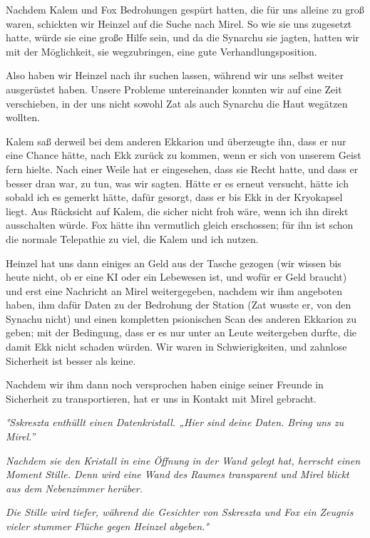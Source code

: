 \documentclass[11pt]{scrartcl}
\begin{document}
Nachdem Kalem und Fox Bedrohungen gespürt hatten, die für uns alleine zu
groß waren, schickten wir Heinzel auf die Suche nach Mirel. So wie sie
uns zugesetzt hatte, würde sie eine große Hilfe sein, und da die
Synarchu sie jagten, hatten wir mit der Möglichkeit, sie wegzubringen,
eine gute Verhandlungsposition.

Also haben wir Heinzel nach ihr suchen lassen, während wir uns selbst
weiter ausgerüstet haben. Unsere Probleme untereinander konnten wir auf
eine Zeit verschieben, in der uns nicht sowohl Zat als auch Synarchu die
Haut wegätzen wollten.

Kalem saß derweil bei dem anderen Ekkarion und überzeugte ihn, dass er
nur eine Chance hätte, nach Ekk zurück zu kommen, wenn er sich von
unserem Geist fern hielte. Nach einer Weile hat er eingesehen, dass sie
Recht hatte, und dass er besser dran war, zu tun, was wir sagten. Hätte
er es erneut versucht, hätte ich sobald ich es gemerkt hätte, dafür
gesorgt, dass er bis Ekk in der Kryokapsel liegt. Aus Rücksicht auf
Kalem, die sicher nicht froh wäre, wenn ich ihn direkt ausschalten
würde. Fox hätte ihn vermutlich gleich erschossen; für ihn ist schon die
normale Telepathie zu viel, die Kalem und ich nutzen.

Heinzel hat uns dann einiges an Geld aus der Tasche gezogen (wir wissen
bis heute nicht, ob er eine KI oder ein Lebewesen ist, und wofür er Geld
braucht) und erst eine Nachricht an Mirel weitergegeben, nachdem wir ihm
angeboten haben, ihm dafür Daten zu der Bedrohung der Station (Zat
wusste er, von den Synachu nicht) und einen kompletten psionischen Scan
des anderen Ekkarion zu geben; mit der Bedingung, dass er es nur unter
an Leute weitergeben durfte, die damit Ekk nicht schaden würden. Wir
waren in Schwierigkeiten, und zahnlose Sicherheit ist besser als keine.

Nachdem wir ihm dann noch versprochen haben einige seiner Freunde in
Sicherheit zu transportieren, hat er uns in Kontakt mit Mirel gebracht.

\emph{°Sskreszta enthüllt einen Datenkristall. „Hier sind deine Daten.
Bring uns zu Mirel.''}

\emph{Nachdem sie den Kristall in eine Öffnung in der Wand gelegt hat,
herrscht einen Moment Stille. Denn wird eine Wand des Raumes transparent
und Mirel blickt aus dem Nebenzimmer herüber.}

\emph{Die Stille wird tiefer, während die Gesichter von Sskreszta und
Fox ein Zeugnis vieler stummer Flüche gegen Heinzel abgeben.°}
\end{document}
